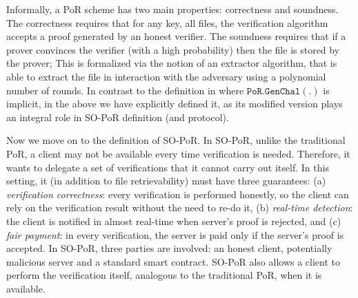 Informally, a PoR scheme has two main properties: correctness and soundness. The correctness requires that for any key, all files, the verification algorithm accepts a proof generated by an honest verifier. The soundness requires that if  a prover convinces the verifier (with a high probability) then the file is  stored by the prover; This is formalized via the notion of an extractor algorithm, that is able to extract the file in interaction with the adversary using a polynomial number of  rounds. In contrast to the definition in \cite{DBLP:conf/asiacrypt/ShachamW08} where $\mathtt{PoR.GenChal}(.)$ is implicit, in the above we have explicitly defined  it, as its modified version  plays an integral role in SO-PoR definition (and protocol). 



Now we move on to the definition of SO-PoR. In  SO-PoR, unlike the traditional PoR, a client may not be available every time  verification is needed. Therefore, it wants to  delegate  a set of verifications that it cannot carry out itself. In this setting, it (in addition to file retrievability)  must have three guarantees: (a) \emph{verification correctness}: every verification is performed honestly, so  the client can rely on the verification result  without the need to re-do it, (b) \emph{real-time detection}: the client is notified in almost real-time when server's  proof is rejected, and (c) \emph{fair payment}: in every verification, the server is paid only if the server's  proof  is accepted. In SO-PoR, three parties are involved: an honest client, potentially malicious server  and a standard smart contract. SO-PoR also allows a client to perform the verification itself, analogous to the traditional  PoR, when it is available. 



